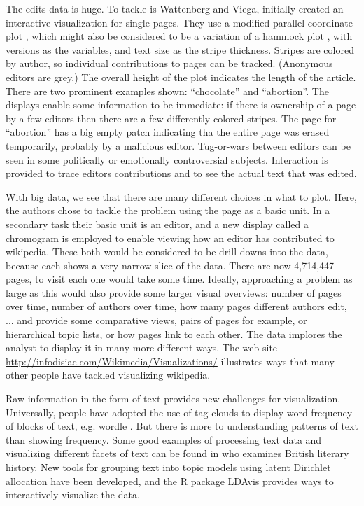 \documentclass[11pt]{article}
\begin{document}
The edits data is huge. To tackle is Wattenberg and Viega, initially created an interactive visualization for single pages. They use a modified parallel coordinate plot \citep{In85,We90}, which might also be considered to be a variation of a hammock plot \citep{hammock,ggparallel}, with versions as the variables, and text size as the stripe thickness. Stripes are colored by author, so individual contributions to pages can be tracked. (Anonymous editors are grey.) The overall height of the plot indicates the length of the article. There are two prominent examples shown: ``chocolate'' and ``abortion''. The displays enable some information to be immediate: if there is ownership of a page by a few editors then there are a few differently colored stripes. The page for ``abortion'' has a big empty patch indicating tha the entire page was erased temporarily, probably by a malicious editor. Tug-or-wars between editors can be seen in some politically or emotionally controversial subjects. Interaction is provided to trace editors contributions and to see the actual text that was edited.

With big data, we see that there are many different choices in what to plot. Here, the authors chose to tackle the problem using the page as a basic unit. In a secondary task their basic unit is an editor, and a new display called a chromogram \citep{wattenberg2007visualizing} is employed to enable viewing how an editor has contributed to wikipedia.  These both would be considered to be drill downs into the data, because each shows a very narrow slice of the data. There are now 4,714,447 pages, to visit each one would take some time. Ideally, approaching a problem as large as this would also provide some larger visual overviews: number of pages over time, number of authors over time, how many pages different authors edit, ... and provide some comparative views, pairs of pages for example, or hierarchical topic lists, or how pages link to each other. The data implores the analyst to display it in many more different ways. The web site \url{http://infodisiac.com/Wikimedia/Visualizations/} illustrates ways that many other people have tackled visualizing wikipedia.

Raw information in the form of text provides new challenges for visualization. Universally, people have adopted the use of tag clouds to display word frequency of blocks of text, e.g. wordle \citep{wordle}. But there is more to understanding patterns of text than showing frequency. Some good examples of processing text data and visualizing different facets of text can be found in \citet{jockers} who examines British literary history. New tools for grouping text into topic models using latent Dirichlet allocation have been developed, and the R \citep{R} package LDAvis \citep{LDAvis} provides ways to interactively visualize the data.
\end{document}
